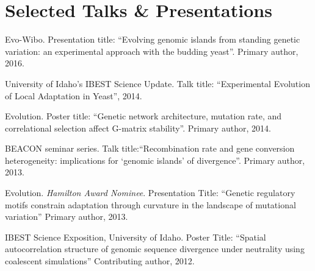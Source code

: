 \documentclass[letterpaper]{article}
\renewenvironment{itemize}{
  \begin{list}{}{
    \setlength{\leftmargin}{1.5em}
  }
}{
  \end{list}
}
\begin{document}



\section*{Selected Talks \& Presentations}

\begin{itemize}
\item Evo-Wibo. Presentation title: ``Evolving genomic islands from standing genetic variation: an experimental approach with the budding yeast''. Primary author, 2016.
\item University of Idaho's IBEST Science Update. Talk title: ``Experimental Evolution of Local Adaptation in Yeast'', 2014.
\item Evolution. Poster title: ``Genetic network architecture, mutation rate, and correlational selection affect G-matrix stability''. Primary author, 2014.
\item BEACON seminar series. Talk title:``Recombination rate and gene conversion heterogeneity: implications for `genomic islands' of divergence''. Primary author, 2013.
\item Evolution. \textit{Hamilton Award Nominee}. Presentation Title: ``Genetic regulatory motifs constrain adaptation through curvature in the landscape of mutational variation'' Primary author, 2013.
\item IBEST Science Exposition, University of Idaho. Poster Title: ``Spatial autocorrelation structure of genomic sequence divergence under neutrality using coalescent simulations'' Contributing author, 2012.

\end{itemize}
\end{document}

